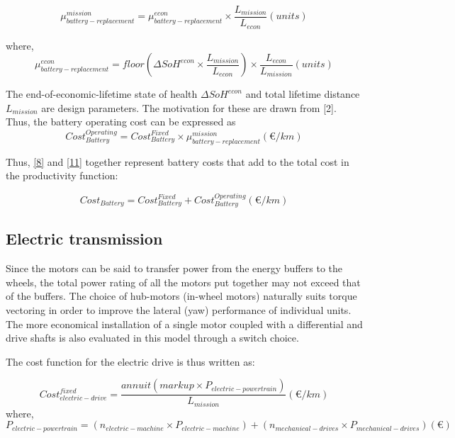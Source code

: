 \documentclass[ExampleMasters.tex]{subfiles}
\begin{document}
			\begin{equation}
				\mu_{battery-replacement}^{mission} = \mu_{battery-replacement}^{econ} \times \frac{L_ {mission}}{L_{econ}} (units)
			\end{equation}

			where,
			\begin{equation}
				\mu_{battery-replacement}^{econ} = floor(\Delta SoH^{econ}\times \frac{L_ {mission}}{L_{econ}}) \times \frac{L_ {econ}}{L_{mission}} (units)
			\end{equation}

			The end-of-economic-lifetime state of health $\Delta SoH^{econ}$ and total lifetime distance $L_{mission}$ are design parameters. The motivation for these are drawn from [2]. Thus, the battery operating cost can be expressed as
			\begin{equation} \label{11}
				Cost_{Battery}^{Operating} = Cost_{Battery}^{Fixed} \times \mu_{battery-replacement}^{mission} (\euro{}/km)
			\end{equation}

			Thus, \eqref{8} and \eqref{11} together represent battery costs that add to the total cost in the productivity function:

			\begin{equation}
				Cost_{Battery} = Cost_{Battery}^{Fixed} + Cost_{Battery}^{Operating} (\euro{}/km)
			\end{equation}

		\subsection{Electric transmission}

			Since the motors can be said to transfer power from the energy buffers to the wheels, the total power rating of all the motors put together may not exceed that of the buffers. The choice of hub-motors (in-wheel motors) naturally suits torque vectoring in order to improve the lateral (yaw) performance of individual units. The more economical installation of a single motor coupled with a differential and drive shafts is also evaluated in this model through a switch choice. 

			The cost function for the electric drive is thus written as:

			\begin{equation}
				Cost_{electric-drive}^{fixed} = \frac{annuit(markup \times P_{electric-powertrain})}{L_{mission}} (\euro{}/km)
			\end{equation}
			where,
			\begin{equation}
				P_{electric-powertrain} = (n_{electric-machine} \times P_{electric-machine}) + (n_{mechanical-drives} \times P_{mechanical-drives}) (\euro{})
			\end{equation}
\end{document}
